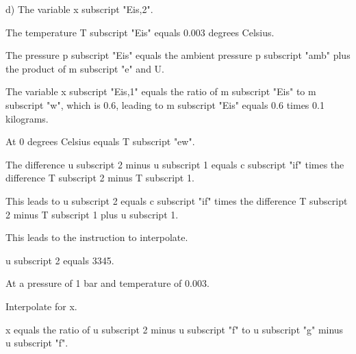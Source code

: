 d) The variable x subscript "Eis,2".

The temperature T subscript "Eis" equals 0.003 degrees Celsius.

The pressure p subscript "Eis" equals the ambient pressure p subscript "amb" plus the product of m subscript "e" and U.

The variable x subscript "Eis,1" equals the ratio of m subscript "Eis" to m subscript "w", which is 0.6, leading to m subscript "Eis" equals 0.6 times 0.1 kilograms.

At 0 degrees Celsius equals T subscript "ew".

The difference u subscript 2 minus u subscript 1 equals c subscript "if" times the difference T subscript 2 minus T subscript 1.

This leads to u subscript 2 equals c subscript "if" times the difference T subscript 2 minus T subscript 1 plus u subscript 1.

This leads to the instruction to interpolate.

u subscript 2 equals 3345.

At a pressure of 1 bar and temperature of 0.003.

Interpolate for x.

x equals the ratio of u subscript 2 minus u subscript "f" to u subscript "g" minus u subscript "f".